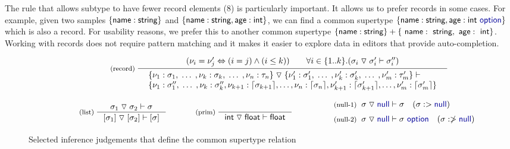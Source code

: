 \documentclass[preprint]{sigplanconf}
\newcommand{\kvd}[1]{\textnormal{\textcolor{kvdclr}{\sffamily #1}}}
\newcommand{\ident}[1]{\textnormal{\sffamily #1}}
\newcommand{\tsep}[0]{\; \triangledown \;}
\newcommand{\addopt}[1]{\lceil#1\rceil}
\begin{document}
\noindent
The rule that allows subtype to have fewer record elements (8) is particularly
important. It allows us to prefer records in some cases. For example, given two samples
$\{ \ident{name}:\ident{string} \}$ and $\{ \ident{name}:\ident{string}, \ident{age}:\ident{int} \}$,
we can find a common supertype $\{ \ident{name}:\ident{string}, \ident{age}:\ident{int}~\kvd{option} \}$
which is also a record. For usability reasons, we prefer this to another common supertype
$\{ \ident{name}:\ident{string} \} + \{ \ident{name}:\ident{string}, \ident{age}:\ident{int} \}$.
Working with records does not require pattern matching and it makes it easier to explore data
in editors that provide auto-completion.


\begin{figure}[t]
\noindent
\begin{equation*}
\hspace{3em}
\inference[(record)\;]
  { (\nu_i = \nu'_j \Leftrightarrow (i = j) \wedge (i \leq k))
      \qquad \forall i\in\{ 1 .. k \}.(\sigma_i \tsep \sigma'_i \vdash \sigma''_i) }
  { \begin{array}{l}
    \{ \nu_1 : \sigma_1,  \; \ldots \;, \nu_k : \sigma_k, \; \ldots \;, \nu_n : \tau_n \} \tsep
    \{ \nu'_1 : \sigma'_1, \; \ldots \;, \nu'_k : \sigma'_k, \; \ldots \;, \nu'_m : \tau'_m \} \vdash\\
    \{ \nu_1 : \sigma''_1, \; \ldots \; , \nu_k : \sigma''_k,
                            \nu_{k+1} : \addopt{\sigma_{k+1}}, \ldots, \nu_n : \addopt{\sigma_n},
                            \nu'_{k+1} : \addopt{\sigma'_{k+1}}, \ldots, \nu'_m : \addopt{\sigma'_m} \}
    \end{array} }
\end{equation*}

\begin{equation*}
\hspace{3em}
\inference[(list)\;]
  {\sigma_1 \tsep \sigma_2 \vdash \sigma}
  {[\sigma_1] \tsep [\sigma_2] \vdash [\sigma]}
\qquad
\inference[(prim)\;]
  { }
  {\ident{int} \tsep \ident{float} \vdash \ident{float}}\quad
\qquad
 \begin{array}{l}
 \textnormal{\footnotesize{(null-1)}}\;\; \sigma \tsep \kvd{null} \vdash \sigma \quad(\sigma :> \kvd{null}) \\[0.6em]
 \textnormal{\footnotesize{(null-2)}}\;\; \sigma \tsep \kvd{null} \vdash \sigma~\kvd{option} \quad(\sigma :\ngtr \kvd{null})
 \end{array}
\end{equation*}

\caption{Selected inference judgements that define the common supertype relation}
\label{fig:subtyping-cst}
\end{figure}
\end{document}

